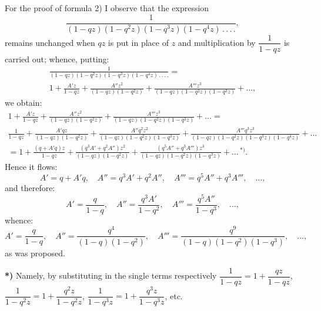 \documentclass{article}
\begin{document}
For the proof of formula 2) I observe that the expression
\[
\frac{1}{(1-qz)(1-q^{2}z)(1-q^{3}z)(1-q^{4}z)\,.\,.\,.\,.},
\]
remains unchanged when $qz$ is put in place of $z$ and multiplication by $\dfrac{1}{1-qz}$ is carried out; whence, putting:
\[
\begin{gathered}
\frac{1}{(1-qz)(1-q^{2}z)(1-q^{3}z)(1-q^{4}z)\,.\,.\,.\,.}=\\[1ex]
1+\frac{A'z}{1-qz}+\frac{A''z^{2}}{(1-qz)(1-q^{2}z)}+\frac{A'''z^{3}}{(1-qz)(1-q^{2}z)(1-q^{3}z)}+\ldots,
\end{gathered}
\]
we obtain:
\[
\begin{gathered}
1+\frac{A'z}{1-qz}+\frac{A''z^{2}}{(1-qz)(1-q^{2}z)}+\frac{A'''z^{3}}{(1-qz)(1-q^{2}z)(1-q^{3}z)}+\ldots=\\[1.5ex]
\frac{1}{1-qz}+\frac{A'qz}{(1-qz)(1-q^{2}z)}+\frac{A''q^{2}z^{2}}{(1-qz)(1-q^{2}z)(1-q^{3}z)}+\frac{A'''q^{3}z^{3}}{(1-qz)(1-q^{2}z)(1-q^{3}z)(1-q^{4}z)}+\ldots\\[1.5ex]
=1+\frac{(q+A'q)z}{1-qz}+\frac{(q^{3}A'+q^{2}A'')z^{2}}{(1-qz)(1-q^{2}z)}+\frac{(q^{5}A''+q^{3}A''')z^{3}}{(1-qz)(1-q^{2}z)(1-q^{3}z)}+\ldots\,{}^{*)}.
\end{gathered}
\]
Hence it flows:
\[
A'=q+A'q,\quad A''=q^{3}A'+q^{2}A'',\quad A'''=q^{5}A''+q^{3}A''',\quad\ldots,
\]
and therefore:
\[
A'=\frac{q}{1-q},\quad A''=\frac{q^{3}A'}{1-q^{2}},\quad A'''=\frac{q^{5}A''}{1-q^{3}},\quad\ldots,
\]
whence:
\[
A'=\frac{q}{1-q},\quad A''=\frac{q^{4}}{(1-q)(1-q^{2})},\quad A'''=\frac{q^{9}}{(1-q)(1-q^{2})(1-q^{3})},\quad\ldots,
\]
as was proposed.

\textbf{*)} Namely, by substituting in the single terms respectively $\dfrac{1}{1-qz}=1+\dfrac{qz}{1-qz}$, $\dfrac{1}{1-q^{2}z}=1+\dfrac{q^{2}z}{1-q^{2}z}$, $\dfrac{1}{1-q^{3}z}=1+\dfrac{q^{3}z}{1-q^{3}z}$, etc.
\end{document}

